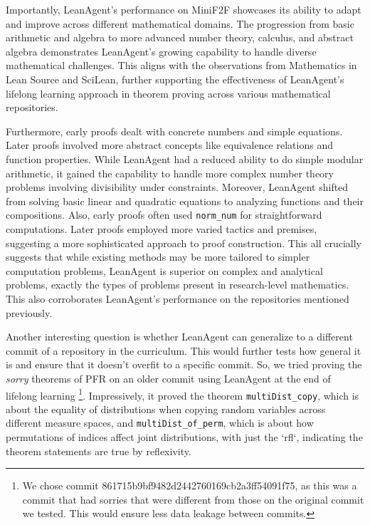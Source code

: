 \documentclass{article} %
\begin{document}
Importantly, LeanAgent's performance on MiniF2F showcases its ability to adapt and improve across different mathematical domains. The progression from basic arithmetic and algebra to more advanced number theory, calculus, and abstract algebra demonstrates LeanAgent's growing capability to handle diverse mathematical challenges. This aligns with the observations from Mathematics in Lean Source and SciLean, further supporting the effectiveness of LeanAgent's lifelong learning approach in theorem proving across various mathematical repositories.

Furthermore, early proofs dealt with concrete numbers and simple equations. Later proofs involved more abstract concepts like equivalence relations and function properties. While LeanAgent had a reduced ability to do simple modular arithmetic, it gained the capability to handle more complex number theory problems involving divisibility under constraints. Moreover, LeanAgent shifted from solving basic linear and quadratic equations to analyzing functions and their compositions. Also, early proofs often used \texttt{norm\_num} for straightforward computations. Later proofs employed more varied tactics and premises, suggesting a more sophisticated approach to proof construction. This all crucially suggests that while existing methods may be more tailored to simpler computation problems, LeanAgent is superior on complex and analytical problems, exactly the types of problems present in research-level mathematics. This also corroborates LeanAgent's performance on the repositories mentioned previously.

Another interesting question is whether LeanAgent can generalize to a different commit of a repository in the curriculum. This would further tests how general it is and ensure that it doesn't overfit to a specific commit. So, we tried proving the \textit{sorry} theorems of PFR on an older commit using LeanAgent at the end of lifelong learning \footnote{We chose commit 861715b9bf9482d2442760169cb2a3ff54091f75, as this was a commit that had sorries that were different from those on the original commit we tested. This would ensure less data leakage between commits.}. Impressively, it proved the theorem \texttt{multiDist\_copy}, which is about the equality of distributions when copying random variables across different measure spaces, and \texttt{multiDist\_of\_perm}, which is about how permutations of indices affect joint distributions, with just the `rfl`, indicating the theorem statements are true by reflexivity.
\end{document}
